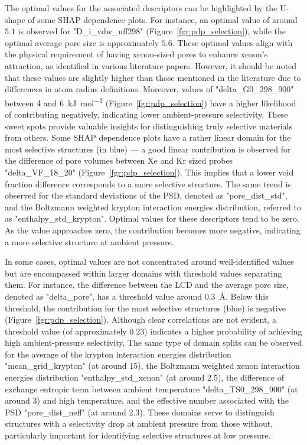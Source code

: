 \documentclass[main]{subfiles}
\begin{document}
The optimal values for the associated descriptors can be highlighted by the U-shape of some SHAP dependence plots. For instance, an optimal value of around $5.1$ is observed for "D\_i\_vdw\_uff298" (Figure~\ref{fgr:pdp_selection}), while the optimal average pore size is approximately $5.6$. These optimal values align with the physical requirement of having  xenon-sized pores to enhance xenon's attraction, as identified in various literature papers. However, it should be noted that these values are slightly higher than those mentioned in the literature due to differences in atom radius definitions.\autocite{Hung_2021} Moreover, values of "delta\_G0\_298\_900" between $4$ and \SI{6}{\kilo\joule\per\mole} (Figure~\ref{fgr:pdp_selection}) have a higher likelihood of contributing negatively, indicating lower ambient-pressure selectivity. These sweet spots provide valuable insights for distinguishing truly selective materials from others. Some SHAP dependence plots have a rather linear domain for the most selective structures (in blue) --- a good linear contribution is observed for the difference of pore volumes between Xe and Kr sized probes "delta\_VF\_18\_20" (Figure~\ref{fgr:pdp_selection}). This implies that a lower void fraction difference corresponds to a more selective structure.  The same trend is observed for the standard deviations of the PSD, denoted as  "pore\_dist\_std", and the Boltzmann weighted krypton interaction energies distribution, referred to as "enthalpy\_std\_krypton". Optimal values for these descriptors tend to be zero. As the value approaches zero, the contribution becomes more negative, indicating a more selective structure at ambient pressure. 

In some cases, optimal values are not concentrated around well-identified values but are encompassed within larger domains with threshold values separating them. For instance, the difference between the LCD and the average pore size, denoted as "delta\_pore", has a threshold value around \SI{0.3}{\angstrom}. Below this threshold, the contribution for the most selective structures (blue) is negative (Figure~\ref{fgr:pdp_selection}). Although clear correlations are not evident, a threshold value (of approximately $0.23$) indicates a higher probability of achieving high ambient-pressure selectivity. The same type of domain splits can be observed for the average of the krypton interaction energies distribution "mean\_grid\_krypton" (at around $15$), the Boltzmann weighted xenon interaction energies distribution "enthalpy\_std\_xenon" (at around $2.5$), the difference of exchange entropic term between ambient temperature "delta\_TS0\_298\_900" (at around $3$) and high temperature, and the effective number associated with the PSD "pore\_dist\_neff" (at around $2.3$). These domains serve to distinguish structures with a selectivity drop at ambient pressure from those without, particularly important for identifying selective structures at low pressure.
\end{document}
